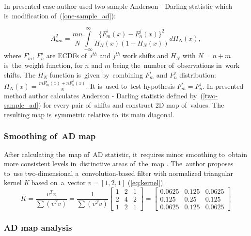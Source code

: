In presented case author used two-sample Anderson - Darling statistic which is~modification of~(\ref{one-sample_ad}):

\begin{equation}
\label{two-sample_ad}
  A^2_{nm}=\frac{mn}{N} \int\limits_{-\infty}^{\infty} \frac{\{F^i_m(x) - F^j_n(x) \}^2} {H_N(x)(1-H_N(x))}dH_N(x),
\end{equation}
where $F^i_m$, $F^j_n$ are ECDFs of~$i^{th}$ and $j^{th}$ work shifts and $H_N$ with $N=n+m$ is~the~weight function, for $n$ and $m$ being the~number of~observations in~work shifts. The $H_N$ function is~given by~combining $F^i_m$ and $F^j_n$ distribution: $H_N(x)=\frac{mF^i_m(x)+nF^j_n(x)}{N}$. It is~used to~test hypothesis $F^i_m=F^j_n$. In presented method author calculates Anderson - Darling statistic defined by~(\ref{two-sample_ad}) for every pair of~shifts and construct 2D map of~values. The resulting map is~symmetric relative to~its main diagonal.

\subsubsection{Smoothing of~AD map}

After calculating the~map of~AD statistic, it~requires minor smoothing to~obtain more consistent levels in~distinctive areas of~the~map \cite{bowman1997applied}. The~author proposes to~use two-dimensional a~convolution-based filter with normalized triangular kernel \emph{K} based on~a~vector $v=\left[1,2,1 \right]$ (\ref{eq:kernel}). 
\begin{equation}
\label{eq:kernel}
K = \frac{v^T v}{\sum{\left(v^T v \right)}} = \frac{1}{\sum{\left(v^T v \right)}}\left[\begin{array}{ccc}1&2&1\\2&4&2\\1&2&1\end{array}\right] =
\left[\begin{array}{ccc}0.0625&0.125&0.0625\\0.125&0.25&0.125\\0.0625&0.125&0.0625\end{array}\right]
\end{equation}

\subsubsection{AD map analysis}

